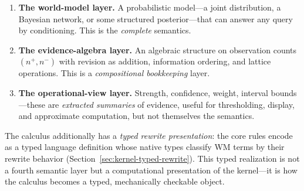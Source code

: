\documentclass[11pt,openany]{report}
\begin{document}
\begin{enumerate}
\item \textbf{The world-model layer.}  A probabilistic model---a joint
  distribution, a Bayesian network, or some structured posterior---that can
  answer any query by conditioning.  This is the \emph{complete} semantics.

\item \textbf{The evidence-algebra layer.}  An algebraic structure on
  observation counts $(n^+, n^-)$ with revision as addition, information
  ordering, and lattice operations.  This is a \emph{compositional bookkeeping}
  layer.

\item \textbf{The operational-view layer.}  Strength, confidence, weight,
  interval bounds---these are \emph{extracted summaries} of evidence, useful for
  thresholding, display, and approximate computation, but not themselves the
  semantics.
\end{enumerate}

\noindent
The calculus additionally has a \emph{typed rewrite presentation}: the core
rules encode as a typed language definition whose native types classify WM
terms by their rewrite behavior (Section~\ref{sec:kernel-typed-rewrite}).
This typed realization is not a fourth semantic layer but a computational
presentation of the kernel---it is how the calculus becomes a typed,
mechanically checkable object.
\end{document}
